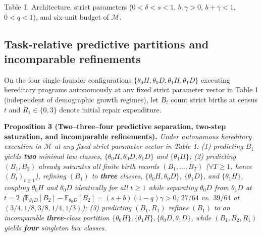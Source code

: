 \documentclass[11pt,letterpaper]{article}
\begin{document}
Table 1. Architecture, strict parameters (\(0 < \delta < s < 1\),
\(b,\gamma > 0\), \(b+\gamma < 1\), \(0 < q < 1\)), and six-unit budget
of \(\mathcal{M}\).

\subsection{Task-relative predictive partitions and incomparable
refinements}\label{task-relative-predictive-partitions-and-incomparable-refinements}

On the four single-founder configurations
\(\{\theta_0 H, \theta_0 D, \theta_1 H, \theta_1 D\}\) executing
hereditary programs autonomously at any fixed strict parameter vector in
Table 1 (independent of demographic growth regimes), let \(B_t\) count
strict births at census \(t\) and \(R_1 \in \{0,3\}\) denote initial
repair expenditure.

\textbf{Proposition 3 (Two--three--four predictive separation, two-step
saturation, and incomparable refinements).} \emph{Under autonomous
hereditary execution in \(\mathcal{M}\) at any fixed strict parameter
vector in Table 1: (1) predicting \(B_1\) yields \textbf{two} minimal
law classes, \(\{\theta_0 H, \theta_0 D, \theta_1 D\}\) and
\(\{\theta_1 H\}\); (2) predicting \((B_1, B_2)\) already saturates all
finite birth records \((B_1,\dots,B_T)\) (\(\forall T \ge 1\), hence
\((B_t)_{t\ge 1}\)), refining \((B_1)\) to \textbf{three} classes,
\(\{\theta_0 H, \theta_0 D\}\), \(\{\theta_1 D\}\), and
\(\{\theta_1 H\}\), coupling \(\theta_0 H\) and \(\theta_0 D\)
identically for all \(t \ge 1\) while separating \(\theta_0 D\) from
\(\theta_1 D\) at \(t=2\)
(\(\mathbb{E}_{\theta_1 D}[B_2] - \mathbb{E}_{\theta_0 D}[B_2] = (s+b)(1-q)\gamma > 0\);
\(27/64\) vs.~\(39/64\) at \((3/4,1/8,3/8,1/4,1/3)\)); (3) predicting
\((B_1, R_1)\) refines \((B_1)\) to an incomparable \textbf{three}-class
partition
\(\{\theta_0 H\}, \{\theta_1 H\}, \{\theta_0 D, \theta_1 D\}\), while
\((B_1, B_2, R_1)\) yields \textbf{four} singleton law classes.}

\end{document}
